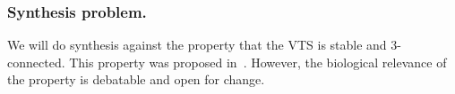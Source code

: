 \subsubsection{Synthesis problem.}

We will do synthesis against the property that the VTS
is stable and 3-connected.
%
%
This property was proposed in~\cite{shukla2017discovering}.
%
However, the biological relevance of the property is debatable and open for change.
%

%
          
